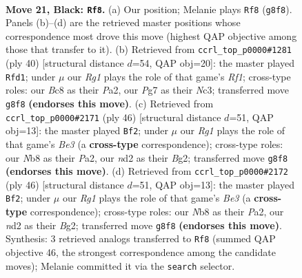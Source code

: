 \documentclass[11pt]{article}
\begin{document}
\clearpage

\begin{figure}[p]\centering
\begin{subfigure}{0.46\textwidth}\centering
\resizebox{\linewidth}{!}{%
\newchessgame
\chessboard[
  setfen={rnb1k1r1/pp2b1pp/8/3pPp1P/8/P5P1/3NN3/R1B1K2R b KQ - 0 21},
  showmover=false,
  pgfstyle=straightmove, color=movearrow, markmove={g8-f8}
]}
\caption{}
\end{subfigure}\hfill
\begin{subfigure}{0.46\textwidth}\centering
\resizebox{\linewidth}{!}{%
\newchessgame
\chessboard[
  setfen={1r3k2/pp2bpp1/5n1r/5P1p/2P5/2N2B1P/P5P1/2R2R1K w - - 1 21},
  showmover=false,
  pgfstyle=straightmove, color=movearrow, markmove={f1-d1}
]}
\caption{}
\end{subfigure}
\\[4pt]
\begin{subfigure}{0.46\textwidth}\centering
\resizebox{\linewidth}{!}{%
\newchessgame
\chessboard[
  setfen={5r1k/pp2r1bp/5pp1/4n3/3R2P1/4B1P1/PP4BP/R5K1 w - - 0 24},
  showmover=false,
  pgfstyle=straightmove, color=movearrow, markmove={e3-f2}
]}
\caption{}
\end{subfigure}\hfill
\begin{subfigure}{0.46\textwidth}\centering
\resizebox{\linewidth}{!}{%
\newchessgame
\chessboard[
  setfen={5r1k/pp2r1bp/5pp1/4n3/3R2P1/4B1P1/PP4BP/R5K1 w - - 0 24},
  showmover=false,
  pgfstyle=straightmove, color=movearrow, markmove={e3-f2}
]}
\caption{}
\end{subfigure}
\caption{\textbf{Move 21, Black: \texttt{Rf8}.} (a) Our position; Melanie plays \texttt{Rf8} (\texttt{g8f8}). Panels (b)--(d) are the retrieved master positions whose correspondence most drove this move (highest QAP objective among those that transfer to it). (b) Retrieved from \texttt{ccrl\_top\_p0000\#1281} (ply 40) [structural distance $d$=54, QAP obj=20]: the master played \texttt{Rfd1}; under $\mu$ our \emph{Rg1} plays the role of that game's \emph{Rf1}; cross-type roles: our \emph{B}c8 as their \emph{P}a2, our \emph{P}g7 as their \emph{N}c3; transferred move \texttt{g8f8} \textbf{(endorses this move)}. (c) Retrieved from \texttt{ccrl\_top\_p0000\#2171} (ply 46) [structural distance $d$=51, QAP obj=13]: the master played \texttt{Bf2}; under $\mu$ our \emph{Rg1} plays the role of that game's \emph{Be3} (a \textbf{cross-type} correspondence); cross-type roles: our \emph{N}b8 as their \emph{P}a2, our \emph{n}d2 as their \emph{B}g2; transferred move \texttt{g8f8} \textbf{(endorses this move)}. (d) Retrieved from \texttt{ccrl\_top\_p0000\#2172} (ply 46) [structural distance $d$=51, QAP obj=13]: the master played \texttt{Bf2}; under $\mu$ our \emph{Rg1} plays the role of that game's \emph{Be3} (a \textbf{cross-type} correspondence); cross-type roles: our \emph{N}b8 as their \emph{P}a2, our \emph{n}d2 as their \emph{B}g2; transferred move \texttt{g8f8} \textbf{(endorses this move)}. Synthesis: 3 retrieved analogs transferred to \texttt{Rf8} (summed QAP objective 46, the strongest correspondence among the candidate moves); Melanie committed it via the \texttt{search} selector.}
\label{fig:thought-m41}
\end{figure}
\end{document}
